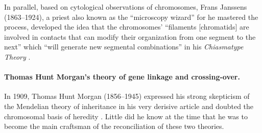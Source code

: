In parallel, based on cytological observations of chromosomes, Frans Janssens (1863--1924), a priest also known as the “microscopy wizard” for he mastered the process, developed the idea that the chromosomes' “filaments [chromatids] are involved in contacts that can modify their organization from one segment to the next” which “will generate new segmental combinations” in his \textit{Chiasmatype Theory} \citep{janssens1909theorie}.



\paragraph{Thomas Hunt Morgan's theory of gene linkage and crossing-over.}
% 
In 1909, Thomas Hunt Morgan (1856--1945) expressed his strong skepticism of the Mendelian theory of inheritance in his very derisive article \textit{} \citep{morgan1909factors} and doubted the chromosomal basis of heredity \citep[reviewed in][]{koszul2012centenary}.
Little did he know at the time that he was to become the main craftsman of the reconciliation of these two theories.\\




